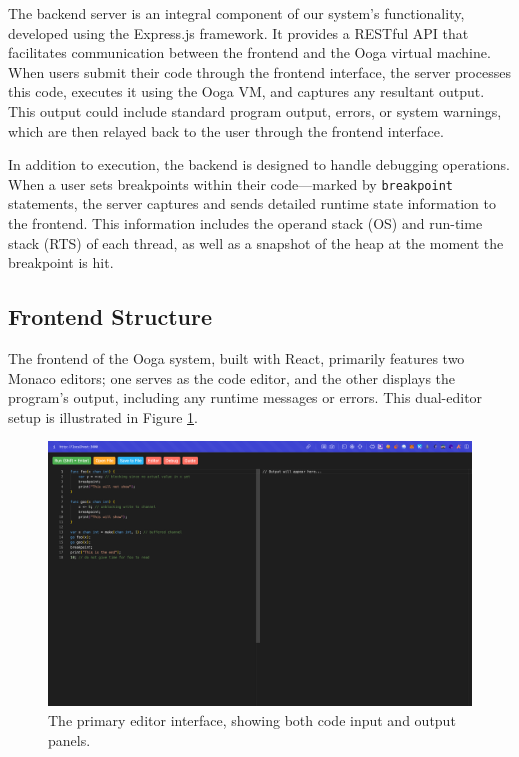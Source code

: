 \documentclass{report}
\begin{document}
The backend server is an integral component of our system's functionality, developed using the Express.js framework. It provides a RESTful API that facilitates communication between the frontend and the Ooga virtual machine. When users submit their code through the frontend interface, the server processes this code, executes it using the Ooga VM, and captures any resultant output. This output could include standard program output, errors, or system warnings, which are then relayed back to the user through the frontend interface.

In addition to execution, the backend is designed to handle debugging operations. When a user sets breakpoints within their code—marked by \texttt{breakpoint} statements, the server captures and sends detailed runtime state information to the frontend. This information includes the operand stack (OS) and run-time stack (RTS) of each thread, as well as a snapshot of the heap at the moment the breakpoint is hit.

\subsection{Frontend Structure}

The frontend of the Ooga system, built with React, primarily features two Monaco editors; one serves as the code editor, and the other displays the program's output, including any runtime messages or errors. This dual-editor setup is illustrated in Figure \ref{fig:editor-view}.

\begin{figure}
    \centering
    \includegraphics[width=1.0\linewidth]{images/editorview.png}
    \caption{The primary editor interface, showing both code input and output panels.}
    \label{fig:editor-view}
\end{figure}
\end{document}

